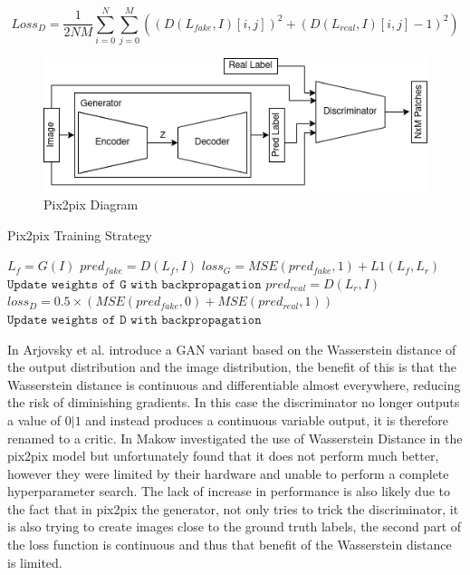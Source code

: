 \documentclass{UoYCSproject}
\begin{document}
\begin{equation}
    \label{eqn:Pix2pix Discriminator Loss}
    Loss_D = \frac{1}{2NM} \sum_{i=0}^{N}  \sum_{j=0}^{M} ( (D(L_{fake}, I)[i,j] )^2 + (D(L_{real}, I)[i,j] - 1)^2)
\end{equation}

\begin{figure}[ht]
    \centering
    \includegraphics[width=\linewidth]{PatchGAN Diagram}
    \caption{Pix2pix Diagram}
    \label{fig:patchGANDiagram}
\end{figure}

\begin{algorithm}
    \caption{Pix2pix Training Strategy}\label{ALG:GAN}
    \begin{algorithmic}[1]
    \State
    \State $L_{f} = G(I)$
    \State
    \State $pred_{fake} = D(L_{f}, I) $
    \State $loss_G = MSE( pred_{fake}, 1 ) + L1(L_{f}, L_{r}) $
    \State $\texttt{Update weights of G with backpropagation}$
    \State
    \State $pred_{real} = D(L_{r}, I)$
    \State $loss_D = 0.5 \times  ( MSE( pred_{fake}, 0) + MSE( pred_{real}, 1) ) $
    \State $\texttt{Update weights of D with backpropagation}$
    \State
    \EndFor
    \EndFor
    \end{algorithmic}
\end{algorithm}
    

In \cite{arjovsky2017wasserstein} Arjovsky et al. introduce a GAN variant based on the Wasserstein distance of the output distribution and the image distribution, the benefit of this is that the Wasserstein distance is continuous and differentiable almost everywhere, reducing the risk of diminishing gradients. In this case the discriminator no longer outputs a value of $0|1$ and instead produces a continuous variable output, it is therefore renamed to a critic. In \cite{pix2pixwasserstein} Makow investigated the use of Wasserstein Distance in the pix2pix model but unfortunately found that it does not perform much better, however they were limited by their hardware and unable to perform a complete hyperparameter search. The lack of increase in performance is also likely due to the fact that in pix2pix the generator, not only tries to trick the discriminator, it is also trying to create images close to the ground truth labels, the second part of the loss function is continuous and thus that benefit of the Wasserstein distance is limited.
\end{document}
